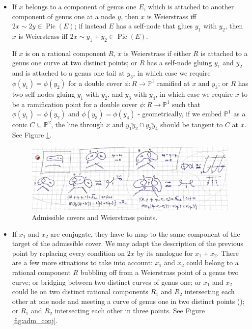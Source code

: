 \documentclass{compositio}
\newcommand{\PP}{\mathbb P}
\renewcommand{\to}{\rightarrow}
\newcommand{\Pic}{\operatorname{Pic}}
\theoremstyle{plain}
\theoremstyle{definition}
\theoremstyle{remark}
\begin{document}
 \begin{itemize}[leftmargin=.5cm]
  \item If $x$ belongs to a component of genus one $E$, which is attached to another component of genus one at a node $y$, then $x$ is Weierstrass iff $2x\sim 2y\in\Pic(E)$; if instead $E$ has a self-node that glues $y_1$ with $y_2$, then $x$ is Weierstrass iff $2x\sim y_1+y_2\in\Pic(E)$.
  
  If $x$ is on a rational component $R$, $x$ is Weierstrass if either $R$ is attached to a genus one curve at two distinct points; or $R$ has a self-node gluing $y_1$ and $y_2$ and is attached to a genus one tail at $y_3$, in which case we require $\phi(y_1)=\phi(y_2)$ for a double cover $\phi\colon R\to\PP^1$ ramified at $x$ and $y_3$; or $R$ has two self-nodes gluing $y_1$ with $y_2$, and $y_3$ with $y_4$, in which case we require $x$ to be a ramification point for a double cover $\phi\colon R\to\PP^1$ such that $\phi(y_1)=\phi(y_2)$ and $\phi(y_3)=\phi(y_4)$ - geometrically, if we embed $\PP^1$ as a conic $C\subseteq\PP^2$, the line through $x$ and $\overline{y_1y_2}\cap\overline{y_3y_4}$ should be tangent to $C$ at $x$. See Figure \ref{fig:adm_W}.
  \begin{center}
  \begin{figure}[!ht]
  \includegraphics[width=\textwidth]{admissible_Weierstrass}
  \caption{Admissible covers and Weierstrass points.}\label{fig:adm_W}
  \end{figure}
  \end{center}
 \item If $x_1$ and $x_2$ are conjugate, they have to map to the same component of the target of the admissible cover. We may adapt the description of the previous point by replacing every condition on $2x$ by its analogue for $x_1+x_2$.  There are a few more situations to take into account: $x_1$ and $x_2$ could belong to a rational component $R$ bubbling off from a Weierstrass point of a genus two curve; or bridging between two distinct curves of genus one; or $x_1$ and $x_2$ could lie on two distinct rational components $R_1$ and $R_2$ intersecting each other at one node and meeting a curve of genus one in two distinct points (\dag); or $R_1$ and $R_2$ intersecting each other in three points. See Figure \ref{fig:adm_conj}.

\end{itemize}
\end{document}
